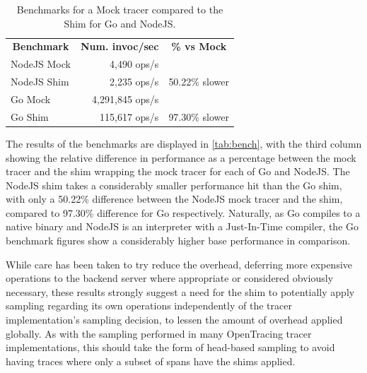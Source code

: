 \documentclass[12pt,pdftex,titlepage]{report}
\begin{document}
                \begin{table}
                    \bgroup
                    \def\arraystretch{1.2}
                        \centering
                        \begin{tabular}{|l|r|c|}
                            \toprule
                            \multicolumn{1}{c}{\textbf{Benchmark}} & \multicolumn{1}{c}{\textbf{Num. invoc/sec}} & \multicolumn{1}{c}{\textbf{\% vs Mock}}  \\ \Xhline{1.05pt}\midrule
                            NodeJS Mock                            & 4,490 ops/s                                 &                                          \\ 
                            NodeJS Shim                            & 2,235 ops/s                                 & 50.22\% slower                           \\ \midrule
                            Go Mock                                & 4,291,845 ops/s                             &                                          \\ 
                            Go Shim                                & 115,617 ops/s                               & 97.30\% slower                           \\ \hline
                        \end{tabular}
                        \caption{Benchmarks for a Mock tracer compared to the Shim for Go and NodeJS.}
                        \label{tab:bench}
                    \egroup
                \end{table}

                The results of the benchmarks are displayed in \autoref{tab:bench}, with the third column showing the relative difference in performance as a percentage between the mock tracer
                and the shim wrapping the mock tracer for each of Go and NodeJS. The NodeJS shim takes a considerably smaller performance hit than the Go shim, with only a 50.22\% difference
                between the NodeJS mock tracer and the shim, compared to 97.30\% difference for Go respectively. Naturally, as Go compiles to a native binary and NodeJS is an interpreter with a
                Just-In-Time compiler, the Go benchmark figures show a considerably higher base performance in comparison.

                While care has been taken to try reduce the overhead, deferring more expensive operations to the backend server where appropriate or considered obviously necessary, these results 
                strongly suggest a need for the shim to potentially apply sampling regarding its own operations independently of the tracer implementation's sampling decision, to lessen the amount of overhead 
                applied globally. As with the sampling performed in many OpenTracing tracer implementations, this should take the form of head-based sampling to avoid having traces where only a subset of spans 
                have the shims applied.
\end{document}
